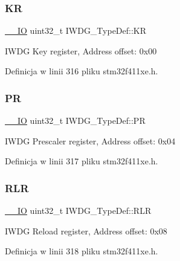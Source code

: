 \subsubsection{\texorpdfstring{KR}{KR}}
{\footnotesize\ttfamily \hyperlink{core__sc300_8h_aec43007d9998a0a0e01faede4133d6be}{\+\_\+\+\_\+\+IO} uint32\+\_\+t I\+W\+D\+G\+\_\+\+Type\+Def\+::\+KR}

I\+W\+DG Key register, Address offset\+: 0x00 

Definicja w linii 316 pliku stm32f411xe.\+h.

\mbox{\label{struct_i_w_d_g___type_def_a5f2717885ff171e686e0347af9e6b68d}} 
\subsubsection{\texorpdfstring{PR}{PR}}
{\footnotesize\ttfamily \hyperlink{core__sc300_8h_aec43007d9998a0a0e01faede4133d6be}{\+\_\+\+\_\+\+IO} uint32\+\_\+t I\+W\+D\+G\+\_\+\+Type\+Def\+::\+PR}

I\+W\+DG Prescaler register, Address offset\+: 0x04 

Definicja w linii 317 pliku stm32f411xe.\+h.

\mbox{\label{struct_i_w_d_g___type_def_aa3703eaa40e447dcacc69c0827595532}} 
\subsubsection{\texorpdfstring{R\+LR}{RLR}}
{\footnotesize\ttfamily \hyperlink{core__sc300_8h_aec43007d9998a0a0e01faede4133d6be}{\+\_\+\+\_\+\+IO} uint32\+\_\+t I\+W\+D\+G\+\_\+\+Type\+Def\+::\+R\+LR}

I\+W\+DG Reload register, Address offset\+: 0x08 

Definicja w linii 318 pliku stm32f411xe.\+h.

\mbox{\label{struct_i_w_d_g___type_def_a9bbfbe921f2acfaf58251849bd0a511c}} 
